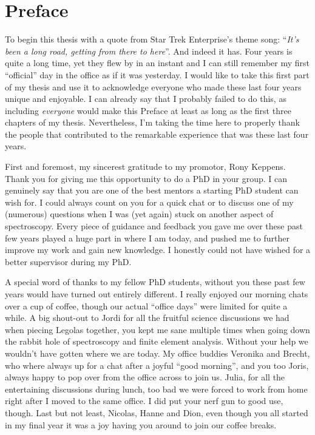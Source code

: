 \chapter*{Preface} \label{ch: preface}

To begin this thesis with a quote from Star Trek Enterprise's theme song: ``\emph{It's been a long road, getting from there to here}''. And indeed it has. Four years is quite a long time, yet they flew by in an instant and I can still remember my first ``official'' day in the office as if it was yesterday. I would like to take this first part of my thesis and use it to acknowledge everyone who made these last four years unique and enjoyable. I can already say that I probably failed to do this, as including \emph{everyone} would make this Preface at least as long as the first three chapters of my thesis. Nevertheless, I'm taking the time here to properly thank the people that contributed to the remarkable experience that was these last four years.

First and foremost, my sincerest gratitude to my promotor, Rony Keppens. Thank you for giving me this opportunity to do a PhD in your group. I can genuinely say that you are one of the best mentors a starting PhD student can wish for. I could always count on you for a quick chat or to discuss one of my (numerous) questions when I was (yet again) stuck on another aspect of spectroscopy. Every piece of guidance and feedback you gave me over these past few years played a huge part in where I am today, and pushed me to further improve my work and gain new knowledge. I honestly could not have wished for a better supervisor during my PhD.

A special word of thanks to my fellow PhD students, without you these past few years would have turned out entirely different. I really enjoyed our morning chats over a cup of coffee, though our actual ``office days'' were limited for quite a while. A big shout-out to Jordi for all the fruitful science discussions we had when piecing Legolas together, you kept me sane multiple times when going down the rabbit hole of spectroscopy and finite element analysis. Without your help we wouldn't have gotten where we are today. My office buddies Veronika and Brecht, who where always up for a chat after a joyful ``good morning'', and you too Joris, always happy to pop over from the office across to join us. Julia, for all the entertaining discussions during lunch, too bad we were forced to work from home right after I moved to the same office. I did put your nerf gun to good use, though. Last but not least, Nicolas, Hanne and Dion, even though you all started in my final year it was a joy having you around to join our coffee breaks.

